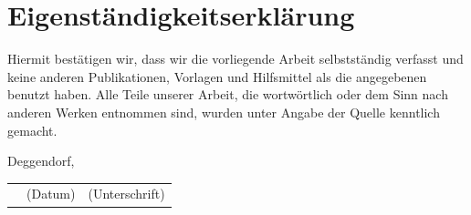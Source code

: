 \documentclass{article}
\begin{document}
\newpage

\section*{Eigenständigkeitserklärung}
Hiermit bestätigen wir, dass wir die vorliegende Arbeit selbstständig verfasst und keine anderen Publikationen, Vorlagen und Hilfsmittel als die angegebenen benutzt haben. Alle Teile unserer Arbeit, die wortwörtlich oder dem Sinn nach anderen Werken entnommen sind, wurden unter Angabe der Quelle kenntlich gemacht.

\vspace{1cm}
Deggendorf, \underline{\hspace{0.715\textwidth}}\\
\begin{tabular}{lll}
  \hspace{3cm} & \small(Datum)\hspace{1cm} & \hspace{2cm}\small(Unterschrift)
\end{tabular}
\newpage
\end{document}
